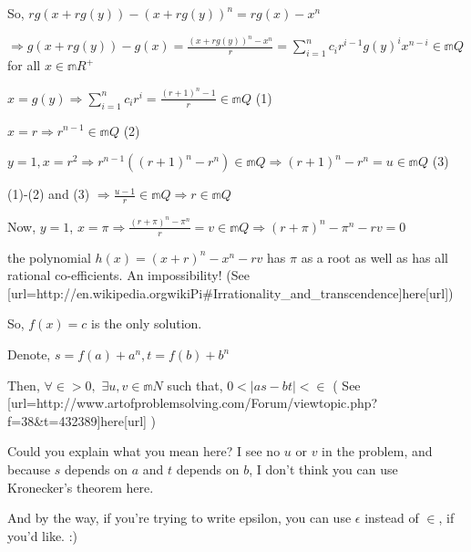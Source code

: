 \begin{solution}
So, $r g \left( x + r g \left( y \right) \right) - \left( x + r g \left( y
\right) \right)^n = r g \left( x \right) - x^n$

$\Longrightarrow g \left( x + r g \left( y \right) \right) - g \left( x
\right) = \frac{\left( x + r g \left( y \right) \right)^n - x^n}{r} = \sum_{i
= 1}^n c_i r^{i - 1} g \left( y \right)^i x^{n - i} \in \mathbb m{Q}$ for all $x \in \mathbb m{R^+}$

$x = g \left( y \right) \Longrightarrow \sum_{i = 1}^n c_i r^i = \frac{\left( r + 1 \right)^n - 1}{r} \in \mathbb m{Q}$     (1)

$x = r \Longrightarrow r^{n - 1} \in \mathbb m{Q}$    (2)

$y = 1, x = r^2 \Longrightarrow r^{n - 1} \left( \left( r + 1 \right)^n - r^n \right) \in \mathbb m{Q} \Longrightarrow \left( r + 1 \right)^n - r^n = u \in \mathbb m{Q}$   (3)

(1)-(2) and (3) $\Longrightarrow \frac{u - 1}{r} \in \mathbb m{Q}
\Longrightarrow r \in \mathbb m{Q}$

Now, $y = 1$, $x = \pi \Longrightarrow \frac{\left( r + \pi \right)^n - \pi^n}{r} = v \in \mathbb m{Q} \Longrightarrow \left( r + \pi \right)^n - \pi^n - r v = 0$

the polynomial $h \left( x \right) = \left( x + r \right)^n - x^n - r v$ has $\pi$ as a root as well as has all rational co-efficients. An impossibility! (See [url=http://en.wikipedia.org\/wiki\/Pi#Irrationality_and_transcendence]here[\/url])

So, $f \left( x \right) = c$ is the only solution.
\end{solution}



\begin{solution}
	\begin{tcolorbox}Denote, $s = f \left( a \right) + a^n %
, t = f \left( b \right) + b^n$

Then, $\forall \in > 0,$ $\exists u, v \in \mathbb m{N}$ such that, $0 <
\left| a s - b t \right| < \in$ ( See [url=http://www.artofproblemsolving.com/Forum/viewtopic.php?f=38&t=432389]here[\/url] )\end{tcolorbox}

Could you explain what you mean here?  I see no $u$ or $v$ in the problem, and because $s$ depends on $a$ and $t$ depends on $b$, I don't think you can use Kronecker's theorem here.

And by the way, if you're trying to write epsilon, you can use $\epsilon$ instead of $\in$, if you'd like. :)
\end{solution}



